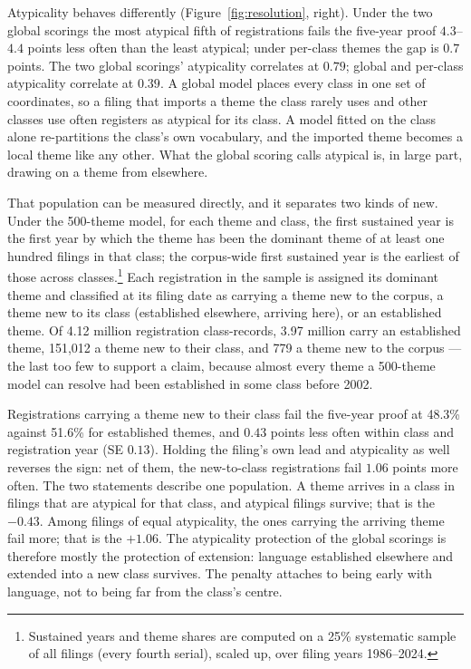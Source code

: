 Atypicality behaves differently (Figure~\ref{fig:resolution}, right).
Under the two global scorings the most atypical fifth of registrations
fails the five-year proof $4.3$--$4.4$ points less often than the least
atypical; under per-class themes the gap is $0.7$ points. The two global
scorings' atypicality correlates at $0.79$; global and per-class
atypicality correlate at $0.39$. A global model places every class in one
set of coordinates, so a filing that imports a theme the class rarely uses
and other classes use often registers as atypical for its class. A model
fitted on the class alone re-partitions the class's own vocabulary, and
the imported theme becomes a local theme like any other. What the global
scoring calls atypical is, in large part, drawing on a theme from
elsewhere.

That population can be measured directly, and it separates two kinds of
new. Under the 500-theme model, for each theme and class, the first
sustained year is the first year by which the theme has been the dominant
theme of at least one hundred filings in that class; the corpus-wide first
sustained year is the earliest of those across classes.\footnote{Sustained
years and theme shares are computed on a 25\% systematic sample of all
filings (every fourth serial), scaled up, over filing years 1986--2024.}
Each registration in the sample is assigned its dominant theme and
classified at its filing date as carrying a theme new to the corpus, a
theme new to its class (established elsewhere, arriving here), or an
established theme. Of 4.12 million registration class-records, 3.97
million carry an established theme, 151{,}012 a theme new to their class,
and 779 a theme new to the corpus --- the last too few to support a
claim, because almost every theme a 500-theme model can resolve had been
established in some class before 2002.

Registrations carrying a theme new to their class fail the five-year proof
at 48.3\% against 51.6\% for established themes, and $0.43$ points less
often within class and registration year (SE $0.13$). Holding the
filing's own lead and atypicality as well reverses the sign: net of them,
the new-to-class registrations fail $1.06$ points more often. The two
statements describe one population. A theme arrives in a class in filings
that are atypical for that class, and atypical filings survive; that is
the $-0.43$. Among filings of equal atypicality, the ones carrying the
arriving theme fail more; that is the $+1.06$. The atypicality protection
of the global scorings is therefore mostly the protection of extension:
language established elsewhere and extended into a new class survives.
The penalty attaches to being early with language, not to being far from
the class's centre.

